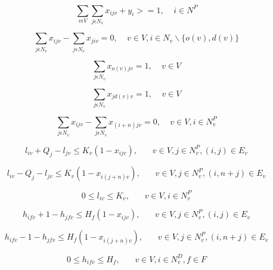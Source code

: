 \documentclass[a4paper,12pt]{article}
\begin{document}
\begin{equation} \label{eq:3}
    \sum_{v\epsilon V}\sum_{j\epsilon N_v}x_{ijv} + y_i >= 1, ~~~~~ i \in N^P
\end{equation}

\begin{equation} \label{eq:4}
    \sum_{j\epsilon N_v}x_{ijv} - \sum_{j\epsilon N_v}x_{jiv} = 0, ~~~~~ v \in V, i\in N_v \backslash \{o(v), d(v)\} 
\end{equation}

\begin{equation} \label{eq:5}
    \sum_{j\epsilon N_v}x_{o(v)jv} = 1, ~~~~~ v \in V
\end{equation}

\begin{equation} \label{eq:6}
    \sum_{j\epsilon N_v}x_{j d(v)v} = 1, ~~~~~ v \in V
\end{equation}

\begin{equation} \label{eq:7}
    \sum_{j\epsilon N_v}x_{ijv} - \sum_{j\epsilon N_v}x_{(i+n)jv} = 0, ~~~~~ v \in V, i\in N^P_v
\end{equation}

\begin{equation} \label{eq:8}
    l_{iv} + Q_j - l_{jv} \leq K_v(1-x_{ijv}),~~~~~~~~ v \in V,j\in N_v^P,(i,j) \in E_v
\end{equation}

\begin{equation} \label{eq:9}
    l_{iv} - Q_j - l_{jv} \leq K_v(1-x_{i(j+n)v}), ~~~~~~~~ v \in V,j\in N_v^P, (i, n+j)\in E_v
\end{equation}

\begin{equation} \label{eq:10}
0 \leq l_{iv} \leq K_v, ~~~~~~~~ v \in V, i \in N^P_v
\end{equation}

\begin{equation} \label{eq:11}
    h_{ifv} + 1 - h_{jfv} \leq H_f(1-x_{ijv}), ~~~~~~~~ v \in V,j\in N_v^P, (i, j)\in E_v
\end{equation}

\begin{equation} \label{eq:12}
    h_{ifv} - 1 - h_{jfv} \leq H_f(1-x_{i(j+n)v}), ~~~~~~~~ v \in V,j\in N_v^P, (i, n+j)\in E_v
\end{equation}

\begin{equation} \label{eq:13}
0 \leq h_{ifv} \leq H_f, ~~~~~~~~ v \in V, i \in N^D_v, f \in F
\end{equation}
\end{document}

